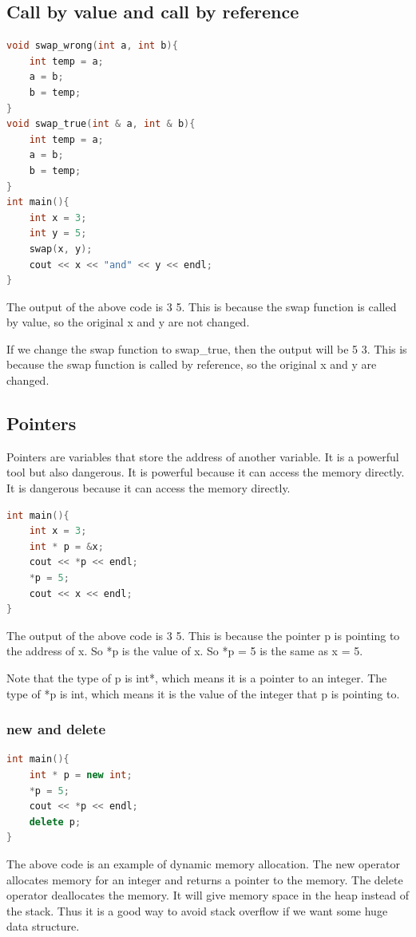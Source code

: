 \documentclass[letterpaper,12pt]{article}
\begin{document}
\subsection{Call by value and call by reference}
\begin{lstlisting}[language=C++]
void swap_wrong(int a, int b){
    int temp = a;
    a = b;
    b = temp;
}
void swap_true(int & a, int & b){
    int temp = a; 
    a = b;
    b = temp;
}
int main(){
    int x = 3;
    int y = 5;
    swap(x, y);
    cout << x << "and" << y << endl;
}  
\end{lstlisting}
The output of the above code is 3 5. This is because the swap function is called by value, so the original x and y are not changed.

If we change the swap function to swap\_true, then the output will be 5 3. This is because the swap function is called by reference, so the original x and y are changed.

\subsection{Pointers}
Pointers are variables that store the address of another variable. It is a powerful tool but also dangerous. It is powerful because it can access the memory directly. It is dangerous because it can access the memory directly.

\begin{lstlisting}[language=C++]
int main(){
    int x = 3;
    int * p = &x;
    cout << *p << endl;
    *p = 5;
    cout << x << endl;
}
\end{lstlisting}
The output of the above code is 3 5. This is because the pointer p is pointing to the address of x. So *p is the value of x. So *p = 5 is the same as x = 5.

Note that the type of p is int*, which means it is a pointer to an integer. The type of *p is int, which means it is the value of the integer that p is pointing to.

\subsubsection{new and delete}
\begin{lstlisting}[language=C++]
int main(){
    int * p = new int;
    *p = 5;
    cout << *p << endl;
    delete p;
}
\end{lstlisting}
The above code is an example of dynamic memory allocation. The new operator allocates memory for an integer and returns a pointer to the memory. The delete operator deallocates the memory. It will give memory space in the heap instead of the stack. Thus it is a good way to avoid stack overflow if we want some huge data structure.
\end{document}
